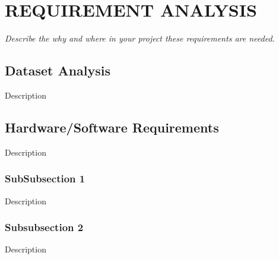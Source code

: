 \section{\MakeUppercase{Requirement Analysis}}
    \textit{Describe the why and where in your project these requirements are needed.}
    \subsection{Dataset Analysis}
    Description
    \subsection{Hardware/Software Requirements}
    Description
        \subsubsection{SubSubsection 1}
        Description
        \subsubsection{Subsubsection 2}
        Description
